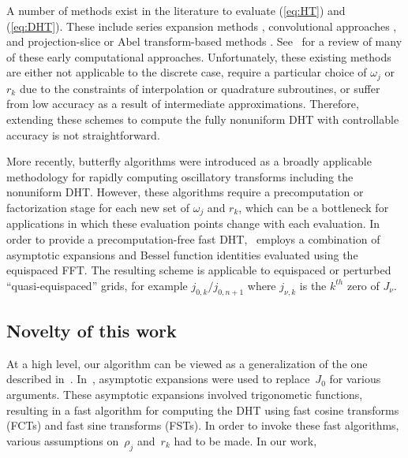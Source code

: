 A number of methods exist in the literature to evaluate (\ref{eq:HT}) and
(\ref{eq:DHT}). These include series expansion methods
\cite{lord1954b,brunol1977fourier,cavanagh1979numerical},
convolutional approaches \cite{siegman1977quasi, johansen1979fast,
mook1983algorithm, liu1999nonuniform}, and projection-slice or Abel transform-based methods
\cite{oppenheim1980computation, hansen1985fast, kapur1995algorithm}.
See~\cite{cree1993algorithms} for a review of many of these early computational
approaches. Unfortunately, these existing methods are either not applicable to
the discrete case, require a particular choice of $\omega_j$ or $r_k$ due to the
constraints of interpolation or quadrature subroutines, or suffer from low
accuracy as a result of intermediate approximations. Therefore, extending these
schemes to compute the fully nonuniform DHT with controllable accuracy is not
straightforward.

More recently, butterfly algorithms \cite{oneil2010algorithm, li2015butterfly,
  pang2020interpolative} were introduced as a broadly applicable methodology for
rapidly computing oscillatory transforms including the nonuniform DHT. However,
these algorithms require a precomputation or factorization stage for each new
set of $\omega_j$ and $r_k$, which can be a bottleneck for applications in which
these evaluation points change with each evaluation. In order to provide a
precomputation-free fast DHT,~\cite{townsend2015fast} employs a combination of
asymptotic expansions and Bessel function identities evaluated using the
equispaced FFT. The resulting scheme is applicable to equispaced or perturbed
``quasi-equispaced'' grids, for example $j_{0,k} / j_{0,n+1}$ where $j_{\nu,k}$
is the $k^{th}$ zero of $J_\nu$.


\subsection*{Novelty of this work}

At a high level, our algorithm can be viewed as a generalization of the one
described in~\cite{townsend2015fast}. In~\cite{townsend2015fast}, asymptotic
expansions were used to replace~$J_0$ for various arguments. These asymptotic
expansions involved trigonometic functions, resulting in a fast algorithm for
computing the DHT using fast cosine transforms (FCTs) and fast sine transforms
(FSTs). In order to invoke these fast algorithms, various assumptions
on~$\rho_j$ and~$r_k$ had to be made. In our work, 


